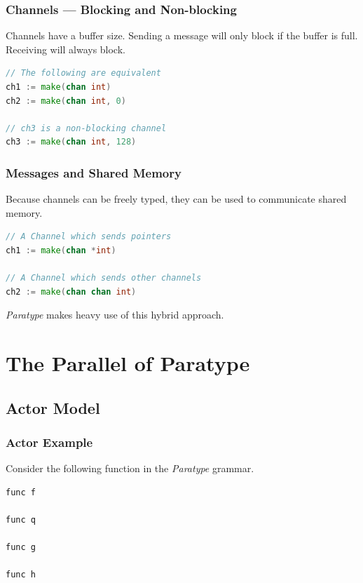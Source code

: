 \documentclass{beamer}
\begin{document}
\begin{frame}[fragile]
  \frametitle{Channels --- Blocking and Non-blocking}

  Channels have a buffer size. Sending a message will only block if
  the buffer is full. Receiving will always block.
  \begin{lstlisting}[language=Go]
// The following are equivalent
ch1 := make(chan int)
ch2 := make(chan int, 0)

// ch3 is a non-blocking channel
ch3 := make(chan int, 128)
  \end{lstlisting}
\end{frame}

\begin{frame}[fragile]
  \frametitle{Messages and Shared Memory}

  Because channels can be freely typed, they can be used to
  communicate shared memory.

  \begin{lstlisting}[language=Go]
// A Channel which sends pointers
ch1 := make(chan *int)

// A Channel which sends other channels
ch2 := make(chan chan int)
  \end{lstlisting}

\vspace{2em}
\emph{Paratype} makes heavy use of this hybrid approach.
\end{frame}


\section{The Parallel of Paratype}

\subsection{Actor Model}


\begin{frame}[fragile]
  \frametitle{Actor Example}

  Consider the following function in the \emph{Paratype} grammar.
  \begin{lstlisting}[language=Paratype]
func f

func q

func g

func h
  \end{lstlisting}
\end{frame}
\end{document}
